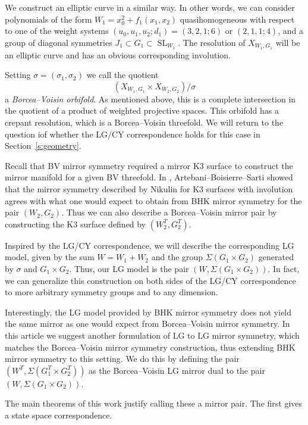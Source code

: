 \documentclass[10pt, letterpaper]{amsart}
\theoremstyle{remark}
\newcommand{\s}[1]{\Sigma #1}
\DeclareMathOperator{\SL}{SL}
\begin{document}
We construct an elliptic curve in a similar way. In other words, we can consider polynomials of the form $W_1=x_0^2+f_1(x_1,x_2)$ quasihomogeneous with respect to one of the weight systems $(u_0,u_1,u_2;d_1)=(3,2,1;6)$ or $(2,1,1;4)$, and a group of diagonal symmetries $J_1\subset G_1\subset \SL_{W_1}$. The resolution of $X_{W_1,G_1}$ will be an elliptic curve and has an obvious corresponding involution. 

Setting $\sigma=(\sigma_1,\sigma_2)$ we call the quotient 
\[
(X_{W_1,G_1}\times X_{W_2,G_2})/\sigma 
\]
a \emph{Borcea--Voisin orbifold}. As mentioned above, this is a complete intersection in the quotient of a product of weighted projective spaces. This orbifold has a crepant resolution, which is a Borcea--Voisin threefold. We will return to the question iof whether the LG/CY correspondence holds for this case in Section~\ref{s:geometry}.

Recall that BV mirror symmetry required a mirror K3 surface to construct the mirror manifold for a given BV threefold. In \cite{involutions}, Artebani--Boisierre--Sarti showed that the mirror symmetry described by Nikulin for K3 surfaces with involution agrees with what one would expect to obtain from BHK mirror symmetry for the pair $(W_2,G_2)$. Thus we can also describe a Borcea--Voisin mirror pair by constructing the K3 surface defined by $(W_2^T, G_2^T)$. 

Inspired by the LG/CY correspondence, we will describe the corresponding LG model, given by the sum $W=W_1+W_2$ and the group $\s{(G_1\times G_2)}$ generated by $\sigma$ and $G_1\times G_2$. Thus, our LG model is the pair $(W, \s{(G_1\times G_2)})$. In fact, we can generalize this construction on both sides of the LG/CY correspondence to more arbitrary symmetry groups and to any dimension.

Interestingly, the LG model provided by BHK mirror symmetry does not yield the same mirror as one would expect from Borcea--Voisin mirror symmetry. In this article we suggest another formulation of LG to LG mirror symmetry, which matches the Borcea--Voisin mirror symmetry construction, thus extending BHK mirror symmetry to this setting. We do this by defining the pair $(W^T,\s{(G_1^T\times G_2^T)})$ as the Borcea--Voisin LG mirror dual to the pair $(W, \s{(G_1\times G_2)})$.

The main theorems of this work justify calling these a mirror pair. The first gives a state space correspondence. 
\end{document}
